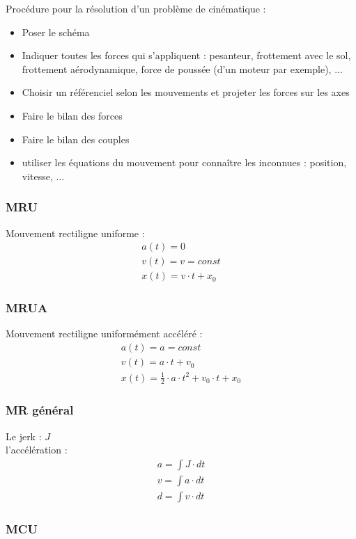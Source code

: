 Procédure pour la résolution d'un problème de cinématique :
\begin{itemize}
	\item Poser le schéma
	\item Indiquer toutes les forces qui s'appliquent : pesanteur, frottement avec le sol, frottement aérodynamique, force de poussée (d'un moteur par exemple), ...
	\item Choisir un référenciel selon les mouvements et projeter les forces sur les axes
	\item Faire le bilan des forces
	\item Faire le bilan des couples
	\item utiliser les équations du mouvement pour connaître les inconnues : position, vitesse, ...
\end{itemize}

\subsubsection{MRU}
Mouvement rectiligne uniforme :
\begin{eqnarray}
a(t)=0\\
v(t)=v=const\\
x(t)=v \cdot t + x_0
\end{eqnarray}

\subsubsection{MRUA}
Mouvement rectiligne uniformément accéléré :
\begin{eqnarray}
a(t)=a=const\\
v(t)=a \cdot t+v_0\\
x(t)=\frac{1}{2} \cdot a \cdot t^2+v_0 \cdot t + x_0
\end{eqnarray}

\subsubsection{MR général}
Le jerk : $J$ \\
l'accélération : 
\begin{eqnarray}
a=\int J \cdot dt\\
v=\int a \cdot dt\\
d=\int v \cdot dt 
\end{eqnarray}



\subsubsection{MCU}
